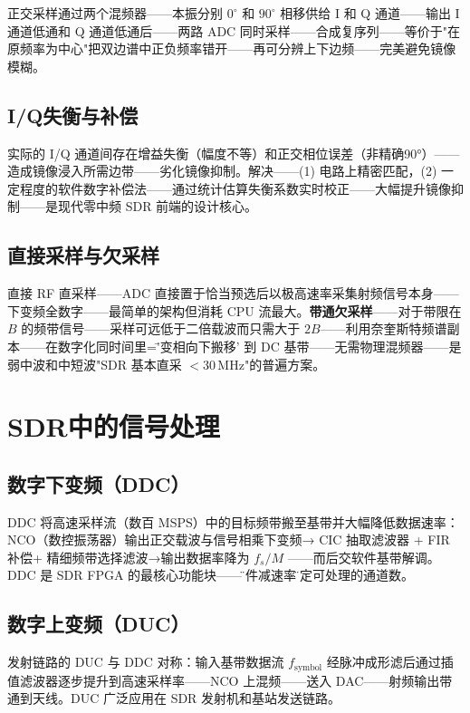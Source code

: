 \documentclass[12pt,UTF8]{ctexbook}
\begin{document}
正交采样通过两个混频器——本振分别 $0^\circ$ 和 $90^\circ$ 相移供给 I 和 Q 通道——输出 I 通道低通和 Q 通道低通后——两路 ADC 同时采样——合成复序列——等价于"在原频率为中心"把双边谱中正负频率错开——再可分辨上下边频——完美避免镜像模糊。

\subsection{I/Q失衡与补偿}

实际的 I/Q 通道间存在增益失衡（幅度不等）和正交相位误差（非精确90°）——造成镜像浸入所需边带——劣化镜像抑制。解决——(1) 电路上精密匹配，(2) 一定程度的软件数字补偿法——通过统计估算失衡系数实时校正——大幅提升镜像抑制——是现代零中频 SDR 前端的设计核心。

\subsection{直接采样与欠采样}

直接 RF 直采样——ADC 直接置于恰当预选后以极高速率采集射频信号本身——下变频全数字——最简单的架构但消耗 CPU 流最大。\textbf{带通欠采样}——对于带限在 $B$ 的频带信号——采样可远低于二倍载波而只需大于 $2B$——利用奈奎斯特频谱副本——在数字化同时间里=\='变相向下搬移' 到 DC 基带——无需物理混频器——是弱中波和中短波"SDR 基本直采 $<30\,\mathrm{MHz}$"的普遍方案。

\section{SDR中的信号处理}
\label{sec:sdr_signal_processing}

\subsection{数字下变频（DDC）}

DDC 将高速采样流（数百 MSPS）中的目标频带搬至基带并大幅降低数据速率：NCO（数控振荡器）输出正交载波与信号相乘下变频→ CIC 抽取滤波器 + FIR 补偿+ 精细频带选择滤波→输出数据率降为 $f_s/M$ ——而后交软件基带解调。DDC 是 SDR FPGA 的最核心功能块——\"硬件减速率\"决定可处理的通道数。

\subsection{数字上变频（DUC）}

发射链路的 DUC 与 DDC 对称：输入基带数据流 $f_{\mathrm{symbol}}$ 经脉冲成形滤后通过插值滤波器逐步提升到高速采样率——NCO 上混频——送入 DAC——射频输出带通到天线。DUC 广泛应用在 SDR 发射机和基站发送链路。
\end{document}
